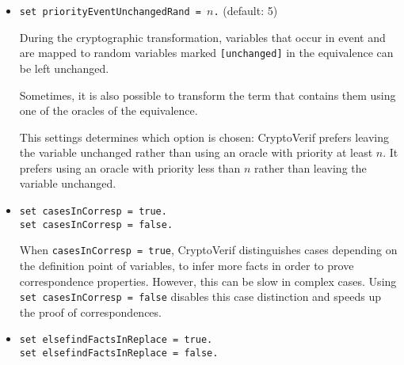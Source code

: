 \begin{itemize}
\begin{itemize}
\item \texttt{set priorityEventUnchangedRand = $n$.} (default: 5)

During the cryptographic transformation, variables that occur in event
and are mapped to random variables marked \texttt{[unchanged]} in the
equivalence can be left unchanged.

Sometimes, it is also possible to transform the term that contains
them using one of the oracles of the equivalence.

This settings determines which option is chosen: CryptoVerif prefers
leaving the variable unchanged rather than using an oracle with
priority at least $n$. It prefers using an oracle with priority
less than $n$ rather than leaving the variable unchanged.

\item \texttt{set casesInCorresp = true.}\\
\texttt{set casesInCorresp = false.}

When \texttt{casesInCorresp = true}, CryptoVerif distinguishes
cases depending on the definition point of variables, to infer
more facts in order to prove correspondence properties.
However, this can be slow in complex cases. Using
\texttt{set casesInCorresp = false} disables this case
distinction and speeds up the proof of correspondences.

% 

\item \texttt{set elsefindFactsInReplace = true.}\\
\texttt{set elsefindFactsInReplace = false.}


\end{itemize}
\end{itemize}
